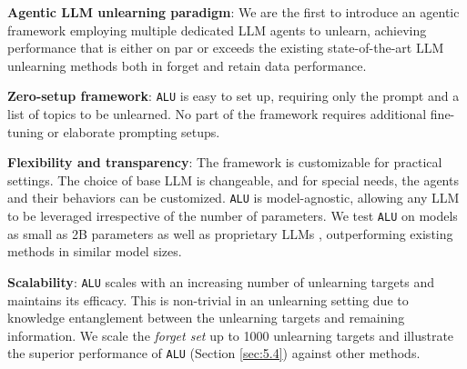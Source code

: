  \textbf{Agentic LLM unlearning paradigm}: We are the first to introduce an agentic framework employing multiple dedicated LLM agents to unlearn, achieving performance that is either on par or exceeds the existing state-of-the-art LLM unlearning methods both in forget and retain data performance.

 \textbf{Zero-setup framework}: \texttt{ALU} is easy to set up, requiring only the prompt and a list of topics to be unlearned. No part of the framework requires additional fine-tuning or elaborate prompting setups.

 \textbf{Flexibility and transparency}: The framework is customizable for practical settings. The choice of base LLM is changeable, and for special needs, the agents and their behaviors can be customized. \texttt{ALU} is model-agnostic, allowing any LLM to be leveraged irrespective of the number of parameters. We test \texttt{ALU} on models as small as 2B parameters \cite{gemmateam2024gemma2improvingopen} as well as proprietary LLMs \cite{achiam2023gpt}, outperforming existing methods in similar model sizes.

 \textbf{Scalability}: \texttt{ALU} scales with an increasing number of unlearning targets and maintains its efficacy. This is non-trivial in an unlearning setting due to knowledge entanglement \cite{liu2024largelanguagemodelunlearning,wu2024evaluating} between the unlearning targets and remaining information. We scale the \emph{forget set} up to 1000 unlearning targets and illustrate the superior performance of \texttt{ALU} (Section \ref{sec:5.4}) against other methods.
